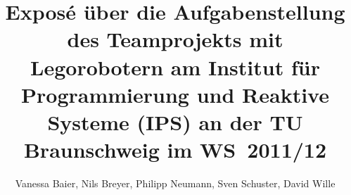 \documentclass[a4paper,12pt]{article}
\begin{document}
\author{Vanessa Baier, Nils Breyer, Philipp Neumann, Sven Schuster, David Wille}
\title{Exposé über die Aufgabenstellung des Teamprojekts mit Legorobotern am Institut für Programmierung und Reaktive Systeme (IPS) an der TU Braunschweig im \mbox{WS 2011/12}}

\maketitle
\end{document}
